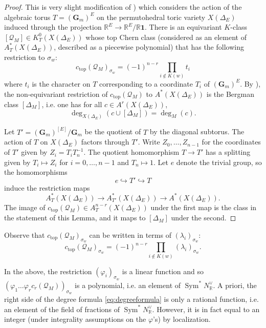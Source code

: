 \documentclass[ALCO,published]{cedram}
\numberwithin{equation}{section}
\numberwithin{figure}{section}
\newcommand{\R}{\mathbb{R}}
\DeclareMathOperator{\topp}{top}
\begin{document}
\begin{proof}
  This is very slight modification of \cite[Theorem~7.6]{BEST}) which considers the action of the algebraic torus $T=(\mathbf{G}_m)^{E}$ on the
  permutohedral toric variety $X(\Delta_{E})$ induced through the projection $\R^E\to \R^{E}/\R\mathbf{1}$. There is an equivariant $K$-class $[\mathcal{Q}_M]\in K^0_T(X(\Delta_{E}))$ whose top Chern class (considered as an element of $A_T^*(X(\Delta_{E}))$, described as a piecewise polynomial) that has the following restriction to $\sigma_w$:
  \[ c_{\topp}(\mathcal{Q}_M)_{\sigma_w}=(-1)^{n-r}\prod_{i\not\in K(w)} t_i\]
  where $t_i$ is the character on $T$ corresponding to a coordinate $T_i$ of $(\mathbf{G}_m)^{E}$. 
  By \cite[Theorem~7.6]{BEST}), the non-equivariant restriction of $c_{\topp}(\mathcal{Q}_M)$ to $A^*(X(\Delta_{E}))$ is the Bergman class $[\Delta_M]$, i.e. one has for  all $c\in A^r(X(\Delta_{E}))$,
  \[\deg_{X(\Delta_{E})}(c \cup [\Delta_M])=\deg_M(c).\]

  Let $T'=(\mathbf{G}_m)^{[E]}/\mathbf{G}_m$ be the quotient of $T$ by the diagonal subtorus. The action of $T$ on $X(\Delta_{E})$ factors through $T'.$ Write $Z_0,\dots,Z_{n-1}$ for the coordinates of $T'$ given by $Z_i=T_iT_n^{-1}$.  The quotient homomorphism $T\to T'$ has a splitting given by $T_i\mapsto Z_i$ for $i=0,\dots,n-1$ and $T_n\mapsto 1$.
  Let $e$ denote the trivial group, so the homomorphisms
  \[e\hookrightarrow T'\hookrightarrow T\]
  induce the restriction maps
  \[A_T^*(X(\Delta_{E}))\to A_{T'}^*(X(\Delta_{E}))\to A^*(X(\Delta_{E})).\]
  The image of $c_{\topp}(\mathcal{Q}_M)\in A^{n-r}_T(X(\Delta_{E}))$ under the first map is the class in the statement of this Lemma, and it maps to $[\Delta_M]$ under the second.
\end{proof}

Observe that $c_{\topp}(\mathcal{Q}_M)_{\sigma_w}$ can be written in terms of $(\lambda_i)_{\sigma_w}$:
\[c_{\topp}(\mathcal{Q}_M)_{\sigma_w}=(-1)^{n-r}\prod_{i\not\in K(w)}(\lambda_i)_{\sigma_w}. \]


In the above, the restriction $(\varphi_i)_{\sigma_w}$ is a linear function and so $(\varphi_1\dots\varphi_rc_r(\mathcal{Q}_M))_{\sigma_w}$ is a polynomial, i.e. an element of $\operatorname{Sym}^* N_{\R}^\vee$.
A priori, the right side of the degree formula \eqref{eq:degreeformula} is only a rational function, i.e. an element of the field of fractions of $\operatorname{Sym}^*N_{\R}^\vee$. However, it is in fact equal to an integer (under integrality assumptions on the $\varphi$'s) by localization.
\end{document}
